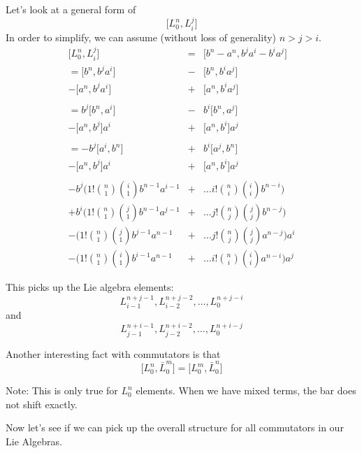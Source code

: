\documentclass{article}
\newcommand{\lrbrack}[2]{\lbrack #1 , #2 \rbrack}
\begin{document}
Let's look at a general form of
\[
\lrbrack{L_0^n}{L_i^j}
\]
In order to simplify, we can assume (without loss of generality) $n>j>i$.
\begin{eqnarray*}
\lrbrack{L_0^n}{L_i^j} & = & \lrbrack{b^n - a^n}{b^j a^i - b^i a^j}\\
= \lrbrack{b^n}{b^j a^i} & - & \lrbrack{b^n}{b^i a^j}\\
- \lrbrack{a^n}{b^j a^i} & + & \lrbrack{a^n}{b^i a^j}\\
& & \\
= b^j \lrbrack{b^n}{a^i} & - & b^i \lrbrack{b^n}{a^j}\\
-\lrbrack{a^n}{b^j} a^i & + & \lrbrack{a^n}{b^i} a^j\\
& & \\
= -b^j \lrbrack{a^i}{b^n} & + & b^i \lrbrack{a^j}{b^n}\\
-\lrbrack{a^n}{b^j} a^i & + & \lrbrack{a^n}{b^i} a^j\\
& & \\
-b^j (1! {n \choose 1}{i \choose 1}b^{n-1}a^{i-1} &+& \dots i!{n \choose i}{i\choose i}b^{n-i})\\
+b^i (1! {n \choose 1}{j \choose 1}b^{n-1}a^{j-1} &+& \dots j!{n \choose j}{j\choose j}b^{n-j})\\
-(1! {n \choose 1}{j \choose 1}b^{j-1}a^{n-1} &+& \dots j!{n \choose j}{j\choose j}a^{n-j}) a^i\\
-(1! {n \choose 1}{i \choose 1}b^{i-1}a^{n-1} &+& \dots i!{n \choose i}{i\choose i}a^{n-i}) a^j
\end{eqnarray*}

This picks up the Lie algebra elements:
\[
L_{i-1}^{n+j-1}, L_{i-2}^{n+j-2},\dots, L_0^{n+j-i}
\]
and 
\[
L_{j-1}^{n+i-1}, L_{j-2}^{n+i-2},\dots, L_0^{n+i-j}
\]


Another interesting fact with commutators is that
\[
\lrbrack{L_0^n}{\bar{L}_0^m} = \lrbrack{L_0^m}{\bar{L}_0^n}
\]

Note: This is only true for $L_0^n$ elements.  When we have mixed terms, the bar does not shift exactly.



Now let's see if we can pick up the overall structure for all commutators in our Lie Algebras.
\end{document}
